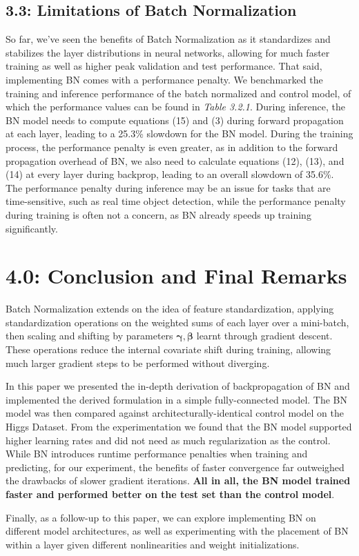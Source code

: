 \documentclass{article}
\begin{document}
\begin{multicols}{2}
\subsection*{3.3: Limitations of Batch Normalization}

So far, we've seen the benefits of Batch Normalization as it standardizes and stabilizes the layer
distributions in neural networks, allowing for much faster training
as well as higher peak validation and test performance. That said, 
implementing BN comes with a performance penalty. We benchmarked the training
and inference performance of the batch normalized and control model, of which 
the performance values can be found in \textit{Table 3.2.1}. During inference, 
the BN model needs to compute equations (15) and (3) during forward propagation
at each layer, leading to a 25.3\% slowdown for the BN model. During the training
process, the performance penalty is even greater, as in addition to the 
forward propagation overhead of BN, we also need to calculate equations (12), (13), and (14)
at every layer during backprop, leading to an overall slowdown of 35.6\%.
The performance penalty during inference may be an issue for tasks that 
are time-sensitive, such as real time object detection, while the performance
penalty during training is often not a concern, as BN already speeds up training
significantly.

\section*{4.0: Conclusion and Final Remarks}

Batch Normalization extends on the idea of feature standardization, applying 
standardization operations on the weighted sums of each layer over a mini-batch, 
then scaling and shifting by parameters $\boldsymbol{\gamma}, \boldsymbol{\beta}$ 
learnt through gradient descent. These operations reduce the internal covariate shift
during training, allowing much larger gradient steps to be performed without diverging.

In this paper we presented the in-depth derivation of backpropagation
of BN and implemented the derived formulation in a simple fully-connected model.
The BN model was then compared against architecturally-identical control model
on the Higgs Dataset. From the experimentation we found that the BN model supported
higher learning rates and did not need as much regularization as the control.
While BN introduces runtime performance penalties when training and predicting, 
for our experiment, the benefits of faster convergence far outweighed the 
drawbacks of slower gradient iterations.
\textbf{All in all, the BN model trained faster and performed better on the test set 
than the control model}.

Finally, as a follow-up to this paper, we can explore implementing BN on 
different model architectures, as well as experimenting with the placement 
of BN within a layer given different nonlinearities and weight initializations. 





\end{multicols}
\end{document}
